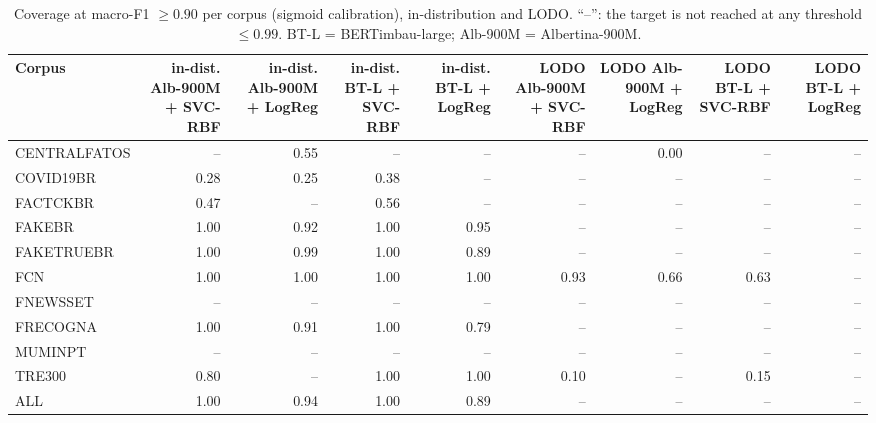 \begin{table}[t]
\centering
\scriptsize
\caption{Coverage at macro-F1 $\ge 0.90$ per corpus (sigmoid calibration), in-distribution and LODO. ``--'': the target is not reached at any threshold $\le 0.99$. BT-L = BERTimbau-large; Alb-900M = Albertina-900M.}
\label{tab:triage-by-corpus}
\begin{tabular}{lrrrrrrrr}
\toprule
Corpus & in-dist. Alb-900M + SVC-RBF & in-dist. Alb-900M + LogReg & in-dist. BT-L + SVC-RBF & in-dist. BT-L + LogReg & LODO Alb-900M + SVC-RBF & LODO Alb-900M + LogReg & LODO BT-L + SVC-RBF & LODO BT-L + LogReg \\
\midrule
CENTRALFATOS & -- & 0.55 & -- & -- & -- & 0.00 & -- & -- \\
COVID19BR & 0.28 & 0.25 & 0.38 & -- & -- & -- & -- & -- \\
FACTCKBR & 0.47 & -- & 0.56 & -- & -- & -- & -- & -- \\
FAKEBR & 1.00 & 0.92 & 1.00 & 0.95 & -- & -- & -- & -- \\
FAKETRUEBR & 1.00 & 0.99 & 1.00 & 0.89 & -- & -- & -- & -- \\
FCN & 1.00 & 1.00 & 1.00 & 1.00 & 0.93 & 0.66 & 0.63 & -- \\
FNEWSSET & -- & -- & -- & -- & -- & -- & -- & -- \\
FRECOGNA & 1.00 & 0.91 & 1.00 & 0.79 & -- & -- & -- & -- \\
MUMINPT & -- & -- & -- & -- & -- & -- & -- & -- \\
TRE300 & 0.80 & -- & 1.00 & 1.00 & 0.10 & -- & 0.15 & -- \\
ALL & 1.00 & 0.94 & 1.00 & 0.89 & -- & -- & -- & -- \\
\bottomrule
\end{tabular}
\end{table}
